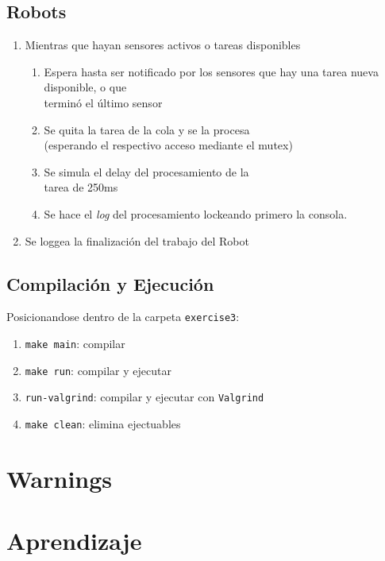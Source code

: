 \documentclass[11pt, a4paper]{article}
\begin{document}
\begin{multicols}{2}
\subsection{Robots}

\begin{enumerate}[label=\Roman*.]
    \item Mientras que hayan sensores activos o tareas disponibles
    \begin{enumerate}[label=\roman*.]
        \item Espera hasta ser notificado por los sensores que hay una tarea nueva disponible, o que\\terminó el último sensor
        \item Se quita la tarea de la cola y se la procesa\\(esperando el respectivo acceso mediante el mutex)
        \item Se simula el delay del procesamiento de la\\tarea de 250ms
        \item Se hace el \textit{log} del procesamiento lockeando primero la consola.
    \end{enumerate}
    \item Se loggea la finalización del trabajo del Robot
\end{enumerate}

\subsection{Compilación y Ejecución}

Posicionandose dentro de la carpeta \lstinline|exercise3|:

\begin{enumerate}[label=\roman*.]
    \item \lstinline|make main|: compilar
    \item \lstinline|make run|: compilar y ejecutar
    \item \lstinline|run-valgrind|: compilar y ejecutar con \lstinline|Valgrind|
    \item \lstinline|make clean|: elimina ejectuables
\end{enumerate}

\newpage

\section*{Warnings}

\section*{Aprendizaje}

\end{multicols}
\end{document}
